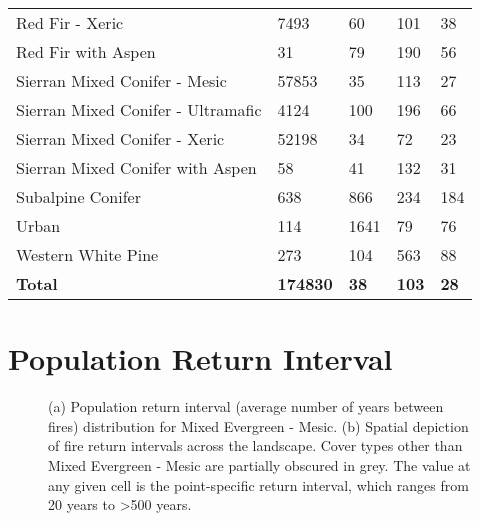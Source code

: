 \begin{table}[!htbp]
\begin{tabular}{@{}lllll@{}}
Red Fir - Xeric                              & 7493     & 60        & 101      & 38  \\
Red Fir with Aspen                           & 31       & 79        & 190      & 56  \\
Sierran Mixed Conifer - Mesic                & 57853    & 35        & 113      & 27  \\
Sierran Mixed Conifer - Ultramafic           & 4124     & 100       & 196      & 66  \\
Sierran Mixed Conifer - Xeric                & 52198    & 34        & 72       & 23  \\
Sierran Mixed Conifer with Aspen             & 58       & 41        & 132      & 31  \\
Subalpine Conifer                            & 638      & 866       & 234      & 184 \\
Urban                                        & 114      & 1641      & 79       & 76  \\
Western White Pine                           & 273      & 104       & 563      & 88  \\
\textbf{Total}       			& \textbf{174830}    & \textbf{38}   & \textbf{103}   & \textbf{28}                                                                                \\ \bottomrule
\end{tabular}
\end{table}



\section{Population Return Interval}

\begin{figure}[!htbp]
  \centering
  \caption{(a) Population return interval (average number of years between fires) distribution for Mixed Evergreen - Mesic. (b) Spatial depiction of fire return intervals across the landscape. Cover types other than Mixed Evergreen - Mesic are partially obscured in grey. The value at any given cell is the point-specific return interval, which ranges from 20 years to \textgreater 500 years.}
    \label{fig:preturn_megm}
\end{figure}

